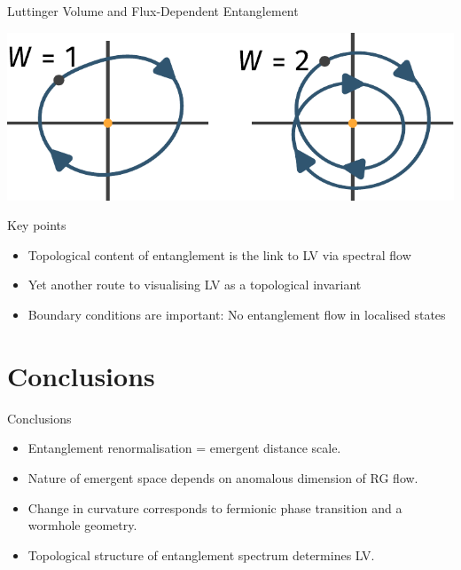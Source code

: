 \documentclass[12pt,aspectratio=169]{beamer}
\begin{document}
\begin{frame}{Luttinger Volume and Flux-Dependent Entanglement}
{	\begin{minipage}{0.48\textwidth}
		\includegraphics[width=\textwidth]{figures/windingNumber.pdf}
	\end{minipage}

	\flushleft
	\alert{Key points}
	\begin{itemize}
		\item Topological content of entanglement is the link to LV via spectral flow
		\item Yet another route to visualising LV as a topological invariant
		\item \alert{Boundary conditions} are important: No entanglement flow in localised states
	\end{itemize}
}
\end{frame}

\section{Conclusions}
\begin{frame}{Conclusions}
	\begin{itemize}
		\item Entanglement renormalisation = emergent distance scale. \\[10pt]
		\item Nature of emergent space depends on anomalous dimension of RG flow.\\[10pt]
		\item Change in curvature corresponds to fermionic phase transition and a wormhole geometry.\\[10pt]
		\item Topological structure of entanglement spectrum determines LV.\\[10pt]
	\end{itemize}
\end{frame}

\printbibliography
\end{document}
